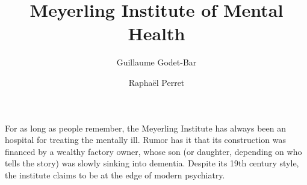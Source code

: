 \documentclass{rpg_location}
\title{Meyerling Institute of Mental Health}
\begin{document}
\author{Guillaume Godet-Bar \and Rapha\"el Perret}
\maketitle


For as long as people remember, the Meyerling Institute has always been an
hospital for treating the mentally ill. Rumor has it that its construction was
financed by a wealthy factory owner, whose son (or daughter, depending on who
tells the story) was slowly sinking into dementia. Despite its 19th century
style, the institute claims to be at the edge of modern psychiatry.
\end{document}
